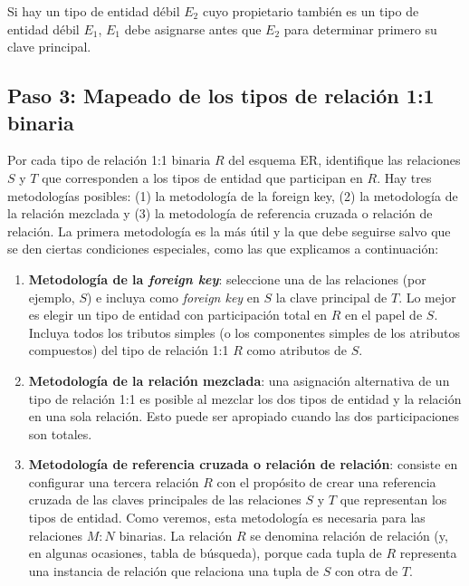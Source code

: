 Si hay un tipo de entidad débil $E_{2}$ cuyo propietario también es un tipo de entidad débil $E_{1}$, $E_{1}$ debe asignarse antes que $E_{2}$ para determinar primero su clave principal.


\subsection*{Paso 3: Mapeado de los tipos de relación 1:1 binaria}

Por cada tipo de relación 1:1 binaria $R$ del esquema ER, identifique las relaciones $S$ y $T$ que corresponden a los tipos de entidad que participan en $R$. Hay tres metodologías posibles: (1) la metodología de la foreign key, (2) la metodología de la relación mezclada y (3) la metodología de referencia cruzada o relación de relación. La primera metodología es la más útil y la que debe seguirse salvo que se den ciertas condiciones especiales, como las que explicamos a continuación:

\begin{enumerate}
    \renewcommand\labelenumi{\bfseries\theenumi}
    \item \textbf{Metodología de la \textit{foreign key}}: seleccione una de las relaciones (por ejemplo, $S$) e incluya como \textit{foreign key} en $S$ la clave principal de $T$. Lo mejor es elegir un tipo de entidad con participación total en $R$ en el papel de $S$. Incluya todos los tributos simples (o los componentes simples de los atributos compuestos) del tipo de relación 1:1 $R$ como atributos de $S$.
    
    \item \textbf{Metodología de la relación mezclada}:  una asignación alternativa de un tipo de relación 1:1 es posible al mezclar los dos tipos de entidad y la relación en una sola relación. Esto puede ser apropiado cuando las dos participaciones son totales.
    
    \item \textbf{Metodología de referencia cruzada o relación de relación}: consiste en configurar una tercera relación $R$ con el propósito de crear una referencia cruzada de las claves principales de las relaciones $S$ y $T$ que representan los tipos de entidad. Como veremos, esta metodología es necesaria para las relaciones $M:N$ binarias. La relación $R$ se denomina relación de relación (y, en algunas ocasiones, tabla de búsqueda), porque cada tupla de $R$ representa una instancia de relación que relaciona una tupla de $S$ con otra de $T$.
\end{enumerate}

